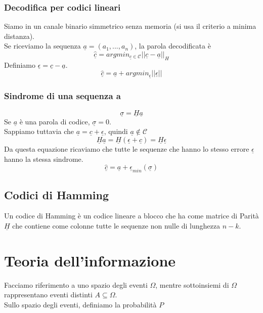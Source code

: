 \documentclass{article}
\begin{document}
\subsubsection{Decodifica per codici lineari}
Siamo in un canale binario simmetrico senza memoria (si usa il criterio a minima distanza).\\
Se riceviamo la sequenza $\underline{a}=(a_1,...,a_n)$, la parola decodificata è $$\hat{\underline{c}}=argmin_{\underline{c}\in\mathcal{C}}||\underline{c}-\underline{a}||_{H}$$
Definiamo $\underline{\epsilon}=\underline{c}-\underline{a}$.\\
$$\hat{\underline{c}}=\underline{a}+argmin_{\underline{\epsilon}}||\underline{\epsilon}||$$

\subsubsection{Sindrome di una sequenza a}
$$\underline{\sigma}=\underline{H}\underline{a}$$
Se $\underline{a}$ è una parola di codice, $\underline{\sigma}=0$.\\
Sappiamo tuttavia che $\underline{a}=\underline{c}+\underline{\epsilon}$, quindi $\underline{a}\not\in\mathcal{C}$
$$\underline{H}\underline{a}=\underline{H}(\underline{\epsilon}+\underline{c})=\underline{H}\underline{\epsilon}$$
Da questa equazione ricaviamo che tutte le sequenze che hanno lo stesso errore $\underline{\epsilon}$ hanno la stessa sindrome.\\
$$\hat{\underline{c}}=\underline{a}+\underline{\epsilon}_{min}(\underline{\sigma})$$

\subsection{Codici di Hamming}
Un codice di Hamming è un codice lineare a blocco che ha come matrice di Parità $\underline{H}$ che contiene come colonne tutte le sequenze non nulle di lunghezza $n-k$.\\











\newpage
\section{Teoria dell'informazione}
Facciamo riferimento a uno spazio degli eventi $\Omega$, mentre sottoinsiemi di $\Omega$ rappresentano eventi distinti $A\subseteq\Omega$.\\
Sullo spazio degli eventi, definiamo la probabilità $P$
\end{document}
